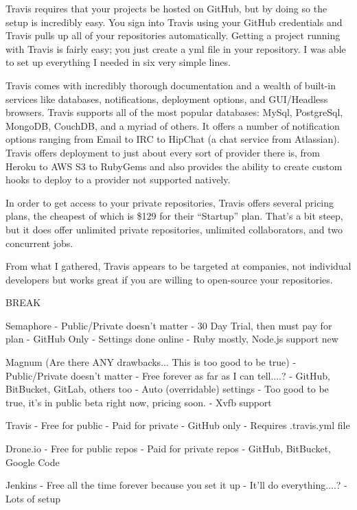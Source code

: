 \documentclass[11pt]{article}
\begin{document}
Travis requires that your projects be hosted on GitHub, but by doing so the setup is incredibly easy. You sign into Travis using your GitHub credentials and Travis pulls up all of your repositories automatically. Getting a project running with Travis is fairly easy; you just create a yml file in your repository. I was able to set up everything I needed in six very simple lines.

Travis comes with incredibly thorough documentation and a wealth of built-in services like databases, notifications, deployment options, and GUI/Headless browsers. Travis supports all of the most popular databases: MySql, PostgreSql, MongoDB, CouchDB, and a myriad of others. It offers a number of notification options ranging from Email to IRC to HipChat (a chat service from Atlassian). Travis offers deployment to just about every sort of provider there is, from Heroku to AWS S3 to RubyGems and also provides the ability to create custom hooks to deploy to a provider not supported natively.

In order to get access to your private repositories, Travis offers several pricing plans, the cheapest of which is \$129 \cite{TravisPricing} for their ``Startup'' plan. That's a bit steep, but it does offer unlimited private repositories, unlimited collaborators, and two concurrent jobs. 

From what I gathered, Travis appears to be targeted at companies, not individual developers but works great if you are willing to open-source your repositories.



BREAK

Semaphore
- Public/Private doesn't matter
- 30 Day Trial, then must pay for plan
- GitHub Only
- Settings done online
- Ruby mostly, Node.js support new

Magnum (Are there ANY drawbacks... This is too good to be true)
- Public/Private doesn't matter
- Free forever as far as I can tell....?
- GitHub, BitBucket, GitLab, others too
- Auto (overridable) settings
- Too good to be true, it's in public beta right now, pricing soon.
- Xvfb support

Travis
- Free for public
- Paid for private
- GitHub only
- Requires .travis.yml file

Drone.io
- Free for public repos
- Paid for private repos
- GitHub, BitBucket, Google Code

Jenkins
- Free all the time forever because you set it up
- It'll do everything....? 
- Lots of setup
\end{document}

